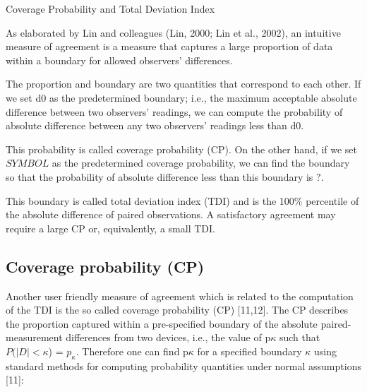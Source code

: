 \documentclass[12pt, a4paper]{report}
\theoremstyle{plain}
\theoremstyle{definition}
\theoremstyle{remark}
\begin{document}

Coverage Probability and Total Deviation Index

As elaborated by Lin and colleagues (Lin, 2000; Lin et al., 2002), an intuitive measure of
agreement is a measure that captures a large proportion of data within a boundary for allowed
observers’ differences. 

The proportion and boundary are two quantities that correspond to
each other. If we set d0 as the predetermined boundary; i.e., the maximum acceptable
absolute difference between two observers’ readings, we can compute the probability of absolute
difference between any two observers’ readings less than d0. 

This probability is called
coverage probability (CP). On the other hand, if we set $SYMBOL$ as the predetermined coverage
probability, we can find the boundary so that the probability of absolute difference less than this boundary is $?$. 


This boundary is called total deviation index (TDI) and is the 
100$\%$
percentile of the absolute difference of paired observations. A satisfactory agreement may
require a large CP or, equivalently, a small TDI.
%


	

		\subsection*{Coverage probability (CP)}
	Another user friendly measure of agreement which is related to the computation of the TDI is the so called coverage probability (CP) [11,12]. 
	The CP describes the proportion captured within a pre-specified boundary of the absolute paired-measurement differences from two devices, i.e., the value of p$\kappa$ such that $P(|D| < \kappa$) = $p_\kappa$. Therefore one can find p$\kappa$ for a specified boundary $\kappa$ using standard methods for computing probability quantities under normal assumptions [11]:
	
\end{document}
